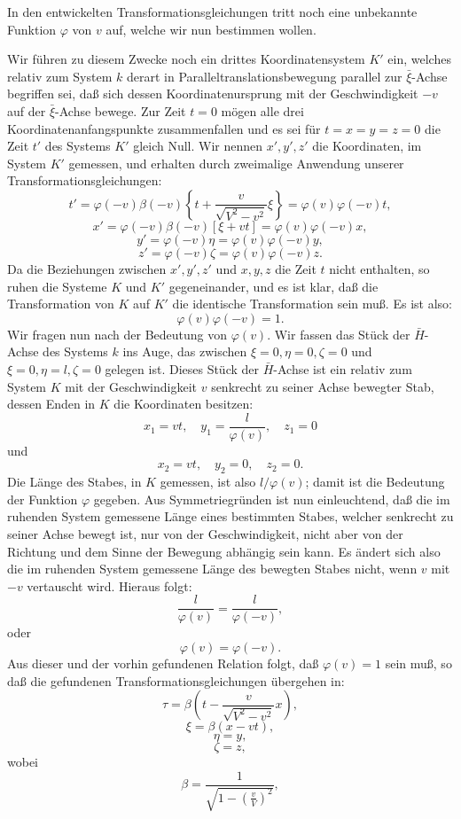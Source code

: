 \documentclass[17pt]{webarticle}       %
\begin{document}
In den entwickelten Transformationsgleichungen tritt noch eine unbekannte Funktion \(\varphi\) von \( v \) auf, welche wir nun bestimmen wollen.

Wir führen zu diesem Zwecke noch ein drittes Koordinatensystem \( K' \) ein, welches relativ zum System \( k \) derart in Paralleltranslationsbewegung parallel zur \(\bar{\xi}\)-Achse begriffen sei, daß sich dessen Koordinatenursprung mit der Geschwindigkeit \( -v \) auf der \(\bar{\xi}\)-Achse bewege. Zur Zeit \( t = 0 \) mögen alle drei Koordinatenanfangspunkte zusammenfallen und es sei für \( t = x = y = z = 0 \) die Zeit \( t' \) des Systems \( K' \) gleich Null. Wir nennen \( x', y', z' \) die Koordinaten, im System \( K' \) gemessen, und erhalten durch zweimalige Anwendung unserer Transformationsgleichungen:
\[
t' = \varphi(-v) \beta(-v) \left\{ t + \frac{v}{\sqrt{V^2 - v^2}} \xi \right\} = \varphi(v) \varphi(-v) t,
\]
\[
x' = \varphi(-v) \beta(-v) [\xi + vt] = \varphi(v) \varphi(-v) x,
\]
\[
y' = \varphi(-v) \eta = \varphi(v) \varphi(-v) y,
\]
\[
z' = \varphi(-v) \zeta = \varphi(v) \varphi(-v) z.
\]
Da die Beziehungen zwischen \( x', y', z' \) und \( x, y, z \) die Zeit \( t \) nicht enthalten, so ruhen die Systeme \( K \) und \( K' \) gegeneinander, und es ist klar, daß die Transformation von \( K \) auf \( K' \) die identische Transformation sein muß. Es ist also:
\[
\varphi(v) \varphi(-v) = 1.
\]
Wir fragen nun nach der Bedeutung von \(\varphi(v)\). Wir fassen das Stück der \(\bar{H}\)-Achse des Systems \( k \) ins Auge, das zwischen \(\xi = 0, \eta = 0, \zeta = 0\) und \(\xi = 0, \eta = l, \zeta = 0\) gelegen ist. Dieses Stück der \(\bar{H}\)-Achse ist ein relativ zum System \( K \) mit der Geschwindigkeit \( v \) senkrecht zu seiner Achse bewegter Stab, dessen Enden in \( K \) die Koordinaten besitzen:
\[
x_1 = vt, \quad y_1 = \frac{l}{\varphi(v)}, \quad z_1 = 0
\]
und
\[
x_2 = vt, \quad y_2 = 0, \quad z_2 = 0.
\]
Die Länge des Stabes, in \( K \) gemessen, ist also \( l / \varphi(v) \); damit ist die Bedeutung der Funktion \(\varphi\) gegeben. Aus Symmetriegründen ist nun einleuchtend, daß die im ruhenden System gemessene Länge eines bestimmten Stabes, welcher senkrecht zu seiner Achse bewegt ist, nur von der Geschwindigkeit, nicht aber von der Richtung und dem Sinne der Bewegung abhängig sein kann. Es ändert sich also die im ruhenden System gemessene Länge des bewegten Stabes nicht, wenn \( v \) mit \( -v \) vertauscht wird. Hieraus folgt:
\[
\frac{l}{\varphi(v)} = \frac{l}{\varphi(-v)},
\]
oder
\[
\varphi(v) = \varphi(-v).
\]
Aus dieser und der vorhin gefundenen Relation folgt, daß \(\varphi(v) = 1\) sein muß, so daß die gefundenen Transformationsgleichungen übergehen in:
\[
\tau = \beta \left( t - \frac{v}{\sqrt{V^2 - v^2}} x \right),
\]
\[
\xi = \beta (x - vt),
\]
\[
\eta = y,
\]
\[
\zeta = z,
\]
wobei
\[
\beta = \frac{1}{\sqrt{1 - \left( \frac{v}{V} \right)^2}},
\]
\end{document}
